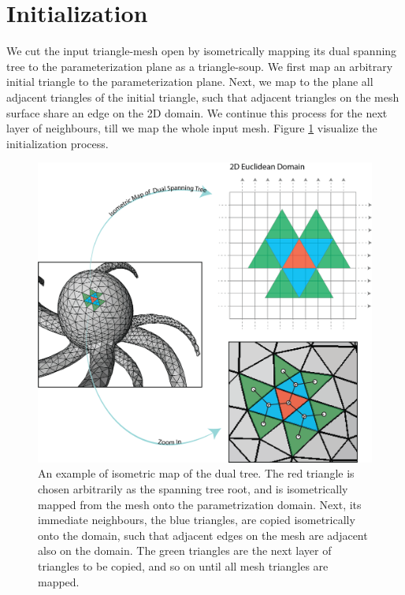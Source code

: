 \section{Initialization}
\label{section:initialization}
We cut the input triangle-mesh open by isometrically mapping its dual spanning tree to the parameterization plane as a triangle-soup. We first map an arbitrary initial triangle to the parameterization plane. Next, we map to the plane all adjacent triangles of the initial triangle, such that adjacent triangles on the mesh surface share an edge on the 2D domain. We continue this process for the next layer of neighbours, till we map the whole input mesh. Figure \ref{fig:initialization} visualize the initialization process.
\begin{figure}[ht]
\centering
\includegraphics[width=13cm]{figures/initialization.png}
\caption[Triangle Soup Initialization]{An example of isometric map of the dual tree. The red triangle is chosen arbitrarily as the spanning tree root, and is isometrically mapped from the mesh onto the parametrization domain. Next, its immediate neighbours, the blue triangles, are copied isometrically onto the domain, such that adjacent edges on the mesh are adjacent also on the domain. The green triangles are the next layer of triangles to be copied, and so on until all mesh triangles are mapped.}
\label{fig:initialization}
\end{figure}
